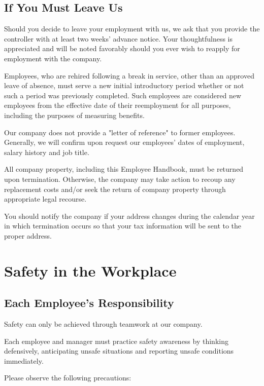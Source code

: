 \documentclass{book}
\begin{document}
\subsection{If You Must Leave Us}

Should you decide to leave your employment with us, we ask that you provide the controller with at least two weeks' advance notice. Your thoughtfulness is appreciated and will be noted favorably should you ever wish to reapply for employment with the company.

Employees, who are rehired following a break in service, other than an approved leave of absence, must serve a new initial introductory period whether or not such a period was previously completed. Such employees are considered new employees from the effective date of their reemployment for all purposes, including the purposes of measuring benefits.

Our company does not provide a "letter of reference" to former employees. Generally, we will confirm upon request our employees' dates of employment, salary history and job title.

All company property, including this Employee Handbook, must be returned upon termination. Otherwise, the company may take action to recoup any replacement costs and/or seek the return of company property through appropriate legal recourse.

You should notify the company if your address changes during the calendar year in which termination occurs so that your tax information will be sent to the proper address.

\section{Safety in the Workplace}

\subsection{Each Employee's Responsibility}

Safety can only be achieved through teamwork at our company.

Each employee and manager must practice safety awareness by thinking defensively, anticipating unsafe situations and reporting unsafe conditions immediately.

Please observe the following precautions:
\end{document}
